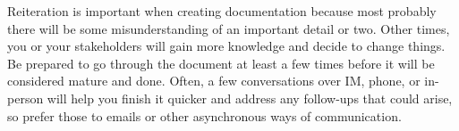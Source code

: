 Reiteration is important when creating documentation because most probably there will be some misunderstanding of an important detail or two. Other times, you or your stakeholders will gain more knowledge and decide to change things. Be prepared to go through the document at least a few times before it will be considered mature and done. Often, a few conversations over IM, phone, or in-person will help you finish it quicker and address any follow-ups that could arise, so prefer those to emails or other asynchronous ways of communication.


























